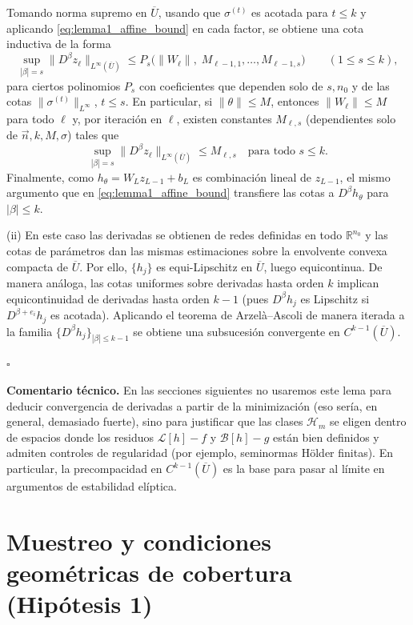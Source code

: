 Tomando norma supremo en $\overline U$, usando que $\sigma^{(t)}$ es acotada para $t\le k$ y aplicando
\eqref{eq:lemma1_affine_bound} en cada factor, se obtiene una cota inductiva de la forma
\begin{equation}\label{eq:lemma1_ind_step_bound}
\sup_{|\beta|=s}\|D^\beta z_\ell\|_{L^\infty(\overline U)}
\le
P_{s}\Big(\|W_\ell\|,\;M_{\ell-1,1},\dots,M_{\ell-1,s}\Big)
\qquad (1\le s\le k),
\end{equation}
para ciertos polinomios $P_s$ con coeficientes que dependen solo de $s,n_0$ y de las cotas
$\|\sigma^{(t)}\|_{L^\infty}$, $t\le s$. En particular, si $\|\theta\|\le M$, entonces
$\|W_\ell\|\le M$ para todo $\ell$ y, por iteración en $\ell$, existen constantes $M_{\ell,s}$ (dependientes
solo de $\vec n,k,M,\sigma$) tales que
\[\sup_{|\beta|=s}\|D^\beta z_\ell\|_{L^\infty(\overline U)}\le M_{\ell,s}\quad\text{para todo }s\le k.
\]
Finalmente, como $h_\theta=W_L z_{L-1}+b_L$ es combinación lineal de $z_{L-1}$, el mismo argumento que en
\eqref{eq:lemma1_affine_bound} transfiere las cotas a $D^\beta h_\theta$ para $|\beta|\le k$.

(ii) En este caso las derivadas se obtienen de redes definidas en todo
$\mathbb R^{n_0}$ y las cotas de parámetros dan las mismas estimaciones
sobre la envolvente convexa compacta de $\overline U$. Por ello,
$\{h_j\}$ es equi-Lipschitz en $\overline U$, luego equicontinua. De manera análoga, las cotas uniformes sobre derivadas hasta orden
$k$ implican equicontinuidad de derivadas hasta orden $k-1$ (pues $D^\beta h_j$ es Lipschitz si
$D^{\beta+e_i}h_j$ es acotada). Aplicando el teorema de Arzelà--Ascoli de manera iterada a la familia
$\{D^\beta h_j\}_{|\beta|\le k-1}$ se obtiene una subsucesión convergente en $C^{k-1}(\overline U)$.

\hfill $\square$

\medskip
\noindent\textbf{Comentario técnico.}
En las secciones siguientes no usaremos este lema para deducir convergencia de derivadas a partir de la minimización (eso sería, en general,
demasiado fuerte), sino para justificar que las clases $\mathcal{H}_m$ se eligen dentro de espacios donde los residuos
$\mathcal{L}[h]-f$ y $\mathcal{B}[h]-g$ están bien definidos y admiten controles de regularidad (por ejemplo, seminormas Hölder finitas).
En particular, la precompacidad en $C^{k-1}(\overline U)$ es la base para pasar al límite en argumentos de estabilidad elíptica.


\section{Muestreo y condiciones geométricas de cobertura (Hipótesis 1)}


